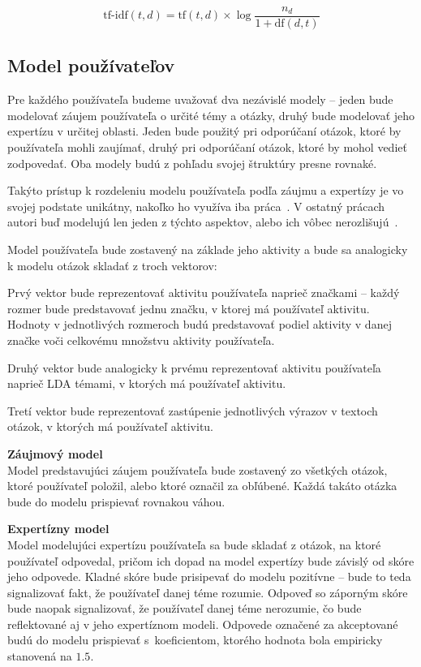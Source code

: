$$\textrm{tf-idf}(t, d) = \textrm{tf}(t, d) \times \log\frac{n_d}{1+\textrm{df}(d, t)}$$

\subsection{Model používateľov}

Pre každého používateľa budeme uvažovať dva nezávislé modely -- jeden bude modelovať záujem používateľa o určité témy a otázky,
druhý bude modelovať jeho expertízu v určitej oblasti. Jeden bude použitý
pri odporúčaní otázok, ktoré by používateľa mohli zaujímať, druhý pri odporúčaní otázok, ktoré by mohol vedieť zodpovedať.
Oba modely budú z pohľadu svojej štruktúry presne rovnaké.

Takýto prístup k rozdeleniu modelu používateľa podľa záujmu a expertízy je vo svojej podstate unikátny, nakoľko ho využíva
iba práca~\cite{Xu2012}. V ostatný prácach autori buď modelujú len jeden z týchto aspektov, alebo ich vôbec nerozlišujú~\cite{Srba2016}.

Model používateľa bude zostavený na základe jeho aktivity a bude sa analogicky k modelu otázok skladať z troch vektorov:

\begin{my_enumerate}
\item{
  Prvý vektor bude reprezentovať aktivitu používateľa naprieč značkami -- každý rozmer bude predstavovať jednu značku,
  v ktorej má používateľ aktivitu. Hodnoty v jednotlivých rozmeroch budú predstavovať podiel aktivity v danej značke voči
  celkovému množstvu aktivity používateľa.
}
\item{
  Druhý vektor bude analogicky k prvému reprezentovať aktivitu používateľa naprieč LDA témami, v ktorých má používateľ aktivitu.
}
\item{
  Tretí vektor bude reprezentovať zastúpenie jednotlivých výrazov v textoch otázok, v ktorých má používateľ aktivitu.
}
\end{my_enumerate}

\textbf{Záujmový model}\\
Model predstavujúci záujem používateľa bude zostavený zo všetkých otázok, ktoré používateľ položil, alebo ktoré označil
za obľúbené. Každá takáto otázka bude do modelu prispievať rovnakou váhou.

\textbf{Expertízny model}\\
Model modelujúci expertízu používateľa sa bude skladať z otázok, na ktoré používateľ odpovedal, pričom ich dopad na model
expertízy bude závislý od skóre jeho odpovede. Kladné skóre bude prisipevať do modelu pozitívne -- bude to teda signalizovať
fakt, že používateľ danej téme rozumie. Odpoveď so záporným skóre bude naopak signalizovať, že používateľ danej téme nerozumie,
čo bude reflektované aj v jeho expertíznom modeli. Odpovede označené za akceptované budú do modelu prispievať
s~koeficientom, ktorého hodnota bola empiricky stanovená na $1.5$.

